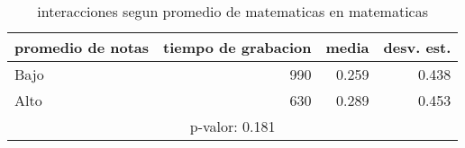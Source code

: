 \documentclass[spanish]{article}
\begin{document}
\begin{table}[h!]
\begin{center}
\begin{tabular}{|l|r|r|r|}
\hline
promedio de notas & tiempo de grabacion & media          & desv. est.    \\ \hline
Bajo              &                 990 &          0.259 &          0.438\\ \hline
Alto              &                 630 &          0.289 &          0.453\\ \hline
\multicolumn{4}{|c|}{p-valor: 0.181} \\ \hline
\end{tabular}
\caption{interacciones segun promedio de matematicas en matematicas}
\end{center}
\end{table}
\end{document}
